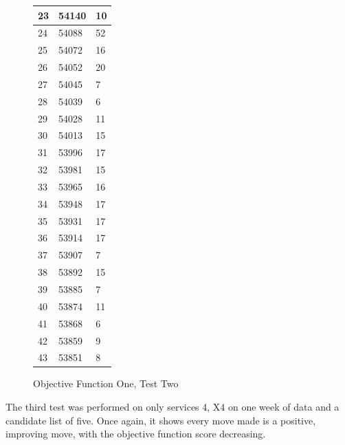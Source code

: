 \documentclass{article}
\begin{document}
\begin{figure}[H]
\begin{tabular}{|l|l|l|}
		\hline
		23              & 54140                    & 10      \\ 
		\hline
		24              & 54088                    & 52      \\ 
		\hline
		25              & 54072                    & 16      \\ 
		\hline
		26              & 54052                    & 20      \\ 
		\hline
		27              & 54045                    & 7       \\ 
		\hline
		28              & 54039                    & 6       \\ 
		\hline
		29              & 54028                    & 11      \\ 
		\hline
		30              & 54013                    & 15      \\ 
		\hline
		31              & 53996                    & 17      \\ 
		\hline
		32              & 53981                    & 15      \\ 
		\hline
		33              & 53965                    & 16      \\ 
		\hline
		34              & 53948                    & 17      \\ 
		\hline
		35              & 53931                    & 17      \\ 
		\hline
		36              & 53914                    & 17      \\ 
		\hline
		37              & 53907                    & 7       \\ 
		\hline
		38              & 53892                    & 15      \\ 
		\hline
		39              & 53885                    & 7       \\ 
		\hline
		40              & 53874                    & 11      \\ 
		\hline
		41              & 53868                    & 6       \\ 
		\hline
		42              & 53859                    & 9       \\ 
		\hline
		43              & 53851                    & 8       \\
		\hline
	\end{tabular}
	\caption{Objective Function One, Test Two}
\end{figure}
\newpage


The third test was performed on only services 4, X4 on one week of data and a candidate list of five. Once again, it shows every move made is a positive, improving move, with the objective function score decreasing. 
\end{document}
